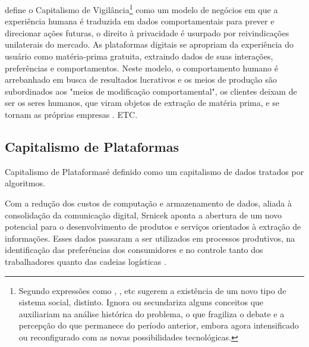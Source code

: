 define o Capitalismo de Vigilância\footnote{\label{nota:novoSistSoc}Segundo \citeauthor{Faustino2023} expressões como , , etc sugerem a existência de um novo tipo de sistema social, distinto. Ignora ou secundariza alguns conceitos que auxiliariam na análise histórica do problema, o que fragiliza o debate e a percepção do que permanece do período anterior, embora agora intensificado ou reconfigurado com as novas possibilidades tecnológicas. } como um modelo de negócios em que a experiência humana é traduzida em dados comportamentais para prever e direcionar ações futuras, o direito à privacidade é usurpado por reivindicações unilaterais do mercado. As plataformas digitais se apropriam da experiência do usuário como matéria-prima gratuita, extraindo dados de suas interações, preferências e comportamentos. Neste modelo, o comportamento humano é arrebanhado em busca de resultados lucrativos e os meios de produção são subordinados aos "meios de modificação comportamental", os clientes deixam de ser os seres humanos, que viram objetos de extração de matéria prima, e se tornam as próprias empresas \cite{Zuboff2019}.
ETC.
\subsection{Capitalismo de Plataformas}
\label{subsec:capPlat}

Capitalismo de Plataformas\footnotemark[\value{footnote}] é definido como um capitalismo de dados tratados por algoritmos. 

Com a redução dos custos de computação e armazenamento de dados, aliada à consolidação da comunicação digital, Srnicek aponta a abertura de um novo potencial para o desenvolvimento de produtos e serviços orientados à extração de informações. Esses dados passaram a ser utilizados em processos produtivos, na identificação das preferências dos consumidores e no controle tanto dos trabalhadores quanto das cadeias logísticas \cite{silveira-demcodigos}. 

